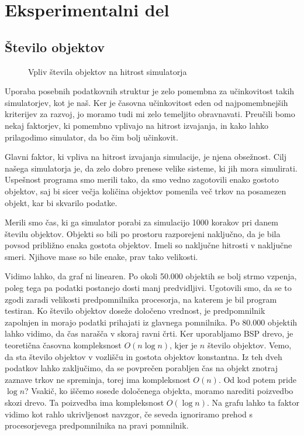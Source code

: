 \documentclass[a4paper,12pt]{article}
\begin{document}
\section{Eksperimentalni del}
\subsection{Število objektov}

\begin{wrapfigure}{r}{0.5\textwidth}
    \caption{Vpliv števila objektov na hitrost simulatorja}
\end{wrapfigure}

Uporaba posebnih podatkovnih struktur je zelo pomembna za učinkovitost takih simulatorjev, kot je naš.
Ker je časovna učinkovitost eden od najpomembnejših kriterijev za razvoj, jo moramo tudi mi zelo temeljito
obravnavati. Preučili bomo nekaj faktorjev, ki pomembno vplivajo na hitrost izvajanja, in kako lahko prilagodimo
simulator, da bo čim bolj učinkovit. 

Glavni faktor, ki vpliva na hitrost izvajanja simulacije, je njena obsežnost. Cilj našega simulatorja je,
da zelo dobro prenese velike sisteme, ki jih mora simulirati. Uspešnost programa smo merili tako, da smo vedno
zagotovili enako gostoto objektov, saj bi sicer večja količina objektov pomenila več trkov na posamezen objekt,
kar bi skvarilo podatke. 

Merili smo čas, ki ga simulator porabi za simulacijo 1000 korakov pri danem številu objektov.
Objekti so bili po prostoru razporejeni naključno, da je bila povsod približno enaka gostota objektov. Imeli so
naključne hitrosti v naključne smeri. Njihove mase so bile enake, prav tako velikosti. 

Vidimo lahko, da graf ni linearen. Po okoli 50.000 objektih se bolj strmo vzpenja, poleg tega pa podatki
postanejo dosti manj predvidljivi. Ugotovili smo, da se to zgodi zaradi velikosti predpomnilnika procesorja, na
katerem je bil program testiran. Ko število objektov doseže določeno vrednost, je predpomnilnik zapolnjen in
morajo podatki prihajati iz glavnega pomnilnika. Po 80.000 objektih lahko vidimo, da čas narašča v skoraj
ravni črti. Ker uporabljamo BSP drevo, je teoretična časovna kompleksnost $O(n \log n)$, kjer je $n$ število objektov.
Vemo, da sta število objektov v vozlišču in gostota objektov konstantna. Iz teh dveh podatkov
lahko zaključimo, da se povprečen porabljen čas na objekt znotraj zaznave trkov ne spreminja, torej ima kompleksnost $O(n)$.
Od kod potem pride $\log n$?
Vsakič, ko iščemo sosede določenega objekta, moramo narediti poizvedbo skozi drevo. Ta poizvedba ima kompleksnost $O(\log n)$. 
Na grafu lahko ta faktor vidimo kot rahlo ukrivljenost navzgor, če seveda ignoriramo prehod s procesorjevega predpomnilnika na pravi pomnilnik.
\end{document}
